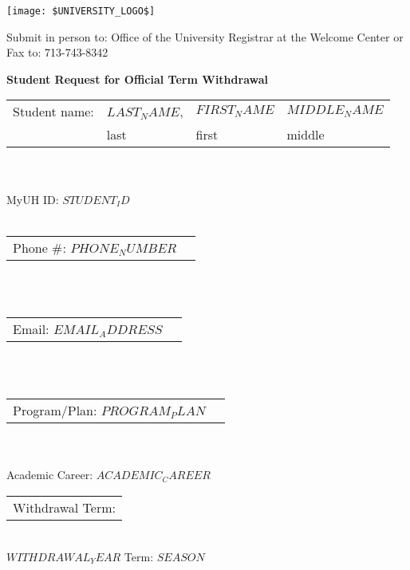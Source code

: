 \documentclass[11pt]{article}
\newcommand{\firstName}{$FIRST_NAME$}
\newcommand{\lastName}{$LAST_NAME$}
\newcommand{\middleName}{$MIDDLE_NAME$}
\newcommand{\studentID}{$STUDENT_ID$}
\newcommand{\phoneNumber}{$PHONE_NUMBER$}
\newcommand{\emailAddress}{$EMAIL_ADDRESS$}
\newcommand{\programPlan}{$PROGRAM_PLAN$}
\newcommand{\academicCareer}{$ACADEMIC_CAREER$}
\newcommand{\withdrawalYear}{$WITHDRAWAL_YEAR$}
\newcommand{\seasonValue}{$SEASON$}
\begin{document}
\thispagestyle{empty}

\begin{center}
  \texttt{[image: \$UNIVERSITY\_LOGO\$]}
  \vspace{1em}
\end{center}

\begin{minipage}{1\textwidth}
  Submit in person to:
  Office of the University Registrar at
  the Welcome Center
  or
  Fax to: 713-743-8342
\end{minipage}

\begin{center}
  \textbf{\Large Student Request for Official Term Withdrawal}
\end{center}

\noindent\begin{tabular}{@{}p{1.2in}p{1in}p{1in}p{1in}@{}} 
Student name: & \underline{\lastName}, & \underline{\firstName} & \underline{\middleName}\\
 & \scriptsize{last} & \scriptsize{first} & \scriptsize{middle}\\
\end{tabular}
\\\\
\hfill MyUH ID: \underline{\studentID}
\\\\
\noindent\begin{tabular}{@{}p{2in}p{2in}@{}}
  Phone \#:   \underline{\phoneNumber} \\
\end{tabular}
\\\\
\noindent\begin{tabular}{@{}p{3in}p{4.5in}@{}}
Email: \underline{\emailAddress} \\
\end{tabular}
\\\\
\noindent\begin{tabular}{@{}p{3in}p{4.5in}@{}}
Program/Plan:  \underline{\programPlan} \\
\end{tabular}
\\\\
\hfill Academic Career: \underline{\academicCareer}
\\

\noindent\begin{tabular}{@{}p{1.8in}@{}}
Withdrawal Term: \\
\end{tabular}
\\
\underline{\withdrawalYear} \hspace{0.2in} Term: \seasonValue
\end{document}
